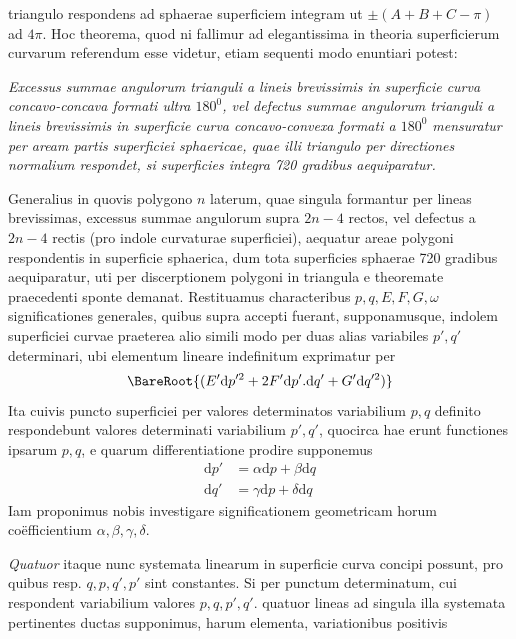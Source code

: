 %
triangulo respondens ad sphaerae superficiem integram ut \(\pm(A+B+C-\pi)\) ad \(4\pi\). Hoc theorema, quod ni fallimur ad elegantissima in theoria superficierum curvarum referendum esse videtur, etiam sequenti modo enuntiari potest:

\textit{Excessus summae angulorum trianguli a lineis brevissimis in superficie curva concavo-concava formati ultra \(180^0\), vel defectus summae angulorum trianguli a lineis brevissimis in superficie curva concavo-convexa formati a \(180^0\) mensuratur per aream partis superficiei sphaericae, quae illi triangulo per directiones normalium respondet, si superficies integra 720 gradibus aequiparatur.}

Generalius in quovis polygono \(n\) laterum, quae singula formantur per lineas brevissimas, excessus summae angulorum supra \(2n-4\) rectos, vel defectus a \(2n-4\) rectis (pro indole curvaturae superficiei), aequatur areae polygoni respondentis in superficie sphaerica, dum tota superficies sphaerae 720 gradibus aequiparatur, uti per discerptionem polygoni in triangula e theoremate praecedenti sponte demanat.
Restituamus characteribus \(p,q,E,F,G,\omega\) significationes generales, quibus supra accepti fuerant, supponamusque, indolem superficiei curvae praeterea alio simili modo per duas alias variabiles \(p',q'\) determinari, ubi elementum lineare indefinitum exprimatur per
\[
\BareRoot{(E'\mathrm{d}p'^2+2F'\mathrm{d}p'\mathord{.}\mathrm{d}q'+G'\mathrm{d}q'^2)}
\]
Ita cuivis puncto superficiei per valores determinatos variabilium \(p,q\) definito respondebunt valores determinati variabilium \(p',q'\), quocirca hae erunt functiones ipsarum \(p,q\), e quarum differentiatione prodire supponemus
\[
\begin{aligned}
\mathrm{d}p'&=\alpha\mathrm{d}p+\beta\mathrm{d}q\\
\mathrm{d}q'&=\gamma\mathrm{d}p+\delta\mathrm{d}q
\end{aligned}
\]
Iam proponimus nobis investigare significationem geometricam horum coëfficientium \(\alpha,\beta,\gamma,\delta\).

\textit{Quatuor} itaque nunc systemata linearum in superficie curva concipi possunt, pro quibus resp. \(q,p,q',p'\) sint constantes. Si per punctum determinatum, cui respondent variabilium valores \(p,q,p',q'\). quatuor lineas ad singula illa systemata pertinentes ductas supponimus, harum elementa, variationibus positivis
